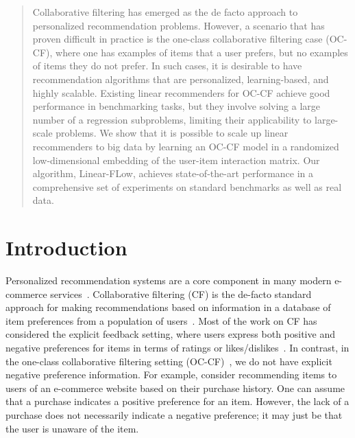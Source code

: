 \documentclass{article}
\newcommand{\citep}{\cite}
\begin{document}
\maketitle
\begin{abstract}
Collaborative filtering has emerged as the de facto approach to personalized recommendation problems. However, a scenario that has proven difficult in practice is the
one-class collaborative filtering case (OC-CF), where one has examples of items that a user prefers, but no examples of items they do not prefer. In such cases, it is desirable to have recommendation algorithms that are personalized, learning-based, and highly scalable. Existing linear recommenders for OC-CF achieve good performance in benchmarking tasks, but they involve solving a large number of a regression subproblems, limiting their applicability to large-scale problems. We show that it is possible to scale up linear recommenders to big data by learning an OC-CF model in a randomized low-dimensional embedding of the user-item interaction matrix. Our algorithm, Linear-FLow, achieves state-of-the-art performance in a comprehensive set of experiments on standard benchmarks as well as real data.

\end{abstract}



\section{Introduction}
Personalized recommendation systems are a core component
in many modern e-commerce services~\citep{Leavitt:2006}. Collaborative
filtering (CF) is the de-facto standard approach for making recommendations
based on information in a database
of item preferences from a population of users~\citep{Goldberg:1992, Sarwar:2001}. Most of the work on CF has considered
the explicit feedback
setting, where users express both positive and negative preferences
for items in terms of ratings or likes/dislikes~\citep{koren2009matrix}. In
contrast, in the one-class collaborative filtering setting (OC-CF)~\citep{Pan:2008}, we do not have
explicit negative preference information. For example, consider
recommending items to users of an e-commerce website
based on their purchase history. One can assume that a
purchase indicates a positive preference for an item. However,
the lack of a purchase does not necessarily indicate
a negative preference; it may just be that the user is unaware
of the item.
\end{document}
